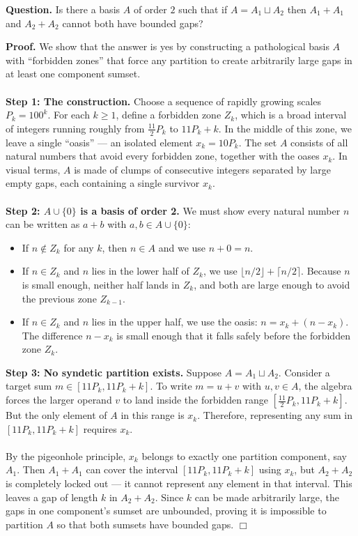
\noindent\textbf{Question.} Is there a basis $A$ of order $2$ such that if $A=A_1\sqcup A_2$ then $A_1+A_1$ and $A_2+A_2$ cannot both have bounded gaps?

\noindent \textbf{Proof.}     We show that the answer is yes by constructing a pathological basis $A$ with ``forbidden zones'' that force any partition to create arbitrarily large gaps in at least one component sumset.
    \\\\
    \textbf{Step 1: The construction.}
    Choose a sequence of rapidly growing scales $P_k = 100^k$. For each $k \ge 1$, define a forbidden zone $Z_k$, which is a broad interval of integers running roughly from $\frac{11}{2} P_k$ to $11 P_k + k$. In the middle of this zone, we leave a single ``oasis'' --- an isolated element $x_k = 10 P_k$. The set $A$ consists of all natural numbers that avoid every forbidden zone, together with the oases $x_k$. In visual terms, $A$ is made of clumps of consecutive integers separated by large empty gaps, each containing a single survivor $x_k$.
    \\\\
    \textbf{Step 2: $A \cup \{0\}$ is a basis of order 2.}
    We must show every natural number $n$ can be written as $a + b$ with $a, b \in A \cup \{0\}$:
    \begin{itemize}
        \item If $n \notin Z_k$ for any $k$, then $n \in A$ and we use $n + 0 = n$.
        \item If $n \in Z_k$ and $n$ lies in the lower half of $Z_k$, we use $\lfloor n/2 \rfloor + \lceil n/2 \rceil$. Because $n$ is small enough, neither half lands in $Z_k$, and both are large enough to avoid the previous zone $Z_{k-1}$.
        \item If $n \in Z_k$ and $n$ lies in the upper half, we use the oasis: $n = x_k + (n - x_k)$. The difference $n - x_k$ is small enough that it falls safely before the forbidden zone $Z_k$.
    \end{itemize}
    \textbf{Step 3: No syndetic partition exists.}
    Suppose $A = A_1 \sqcup A_2$. Consider a target sum $m \in [11 P_k, 11 P_k + k]$. To write $m = u + v$ with $u, v \in A$, the algebra forces the larger operand $v$ to land inside the forbidden range $[\frac{11}{2}P_k, 11 P_k + k]$. But the only element of $A$ in this range is $x_k$. Therefore, representing any sum in $[11 P_k, 11 P_k + k]$ requires $x_k$.
    \\\\
    By the pigeonhole principle, $x_k$ belongs to exactly one partition component, say $A_1$. Then $A_1 + A_1$ can cover the interval $[11 P_k, 11 P_k + k]$ using $x_k$, but $A_2 + A_2$ is completely locked out --- it cannot represent any element in that interval. This leaves a gap of length $k$ in $A_2 + A_2$. Since $k$ can be made arbitrarily large, the gaps in one component's sumset are unbounded, proving it is impossible to partition $A$ so that both sumsets have bounded gaps. \hfill $\Box$